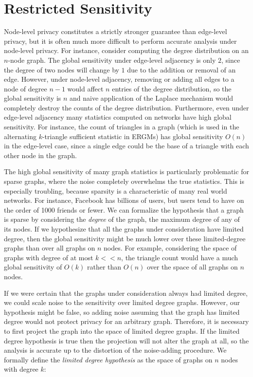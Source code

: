 \section{Restricted Sensitivity}
\label{sec:restricted_sensitivity}

 Node-level privacy constitutes a strictly stronger guarantee than edge-level privacy, but it is often much more difficult to perform accurate analysis under node-level privacy. For instance, consider computing the degree distribution on an $n$-node graph. The global sensitivity under edge-level adjacency is only $2$, since the degree of two nodes will change by $1$ due to the addition or removal of an edge. However, under node-level adjacency, removing or adding all edges to a node of degree $n-1$ would affect $n$ entries of the degree distribution, so the global sensitivity is $n$ and naive application of the Laplace mechanism would completely destroy the counts of the degree distribution. Furthermore, even under edge-level adjacency many statistics computed on networks have high global sensitivity. For instance, the count of triangles in a graph (which is used in the alternating $k$-triangle sufficient statistic in ERGMs) has global sensitivity $O(n)$ in the edge-level case, since a single edge could be the base of a triangle with each other node in the graph.
 
 The high global sensitivity of many graph statistics is particularly problematic for sparse graphs, where the noise completely overwhelms the true statistics. This is especially troubling, because sparsity is a characteristic of many real world networks. For instance, Facebook has billions of users, but  users tend to have on the order of 1000 friends or fewer. We can formalize the hypothesis that a graph is sparse by considering the \emph{degree} of the graph, the maximum degree of any of its nodes. If we hypothesize that all the graphs under consideration have limited degree, then the global sensitivity might be much lower over these limited-degree graphs than over all graphs on $n$ nodes. For example, considering the space of graphs with degree of at most $k << n$, the triangle count would have a much global sensitivity of $O(k)$ rather than $O(n)$ over the space of all graphs on $n$ nodes.
 
 If we were certain that the graphs under consideration always had limited degree, we could scale noise to the sensitivity over limited degree graphs. However, our hypothesis might be false, so adding noise assuming that the graph has limited degree would not protect privacy for an arbitrary graph.  Therefore, it is necessary to first project the graph into the space of limited degree graphs. If the limited degree hypothesis is true then the projection will not alter the graph at all, so the analysis is accurate up to the distortion of the noise-adding procedure. We formally define the \emph{limited degree hypothesis} as the space of graphs on $n$ nodes with degree $k$:
 
